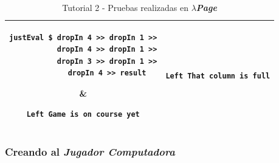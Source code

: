 \documentclass[a4paper]{article}
\newcommand{\hpage}{\textbf{\textsl{$\lambda$Page}}}
\begin{document}
\begin{table}[hp]
\begin{center}
\begin{tabular}{@{} cc @{}}
\begin{lstlisting}
justEval $ dropIn 4 >> dropIn 1 >>
           dropIn 4 >> dropIn 1 >>
           dropIn 3 >> dropIn 1 >>
           dropIn 4 >> result
\end{lstlisting} &
\begin{lstlisting}
Left Game is on course yet
\end{lstlisting} \\[1.5em]

\begin{lstlisting}
justEval $ dropIn 1 >> dropIn 1 >>
           dropIn 1 >> dropIn 1 >>
           dropIn 1 >> dropIn 1 >>
           dropIn 1 >> dropIn 1
\end{lstlisting} &
\begin{lstlisting}
Left That column is full
\end{lstlisting} \\[1.5em]

			\bottomrule
		\end{tabular}
		\caption{Tutorial 2 - Pruebas realizadas en \hpage}
		\label{tut206}
	\end{center}
\end{table}
\lstset{language=haskell, frame=single, tabsize=4}

\newpage
\subsubsection{Creando al \textsl{Jugador Computadora}}
\end{document}
